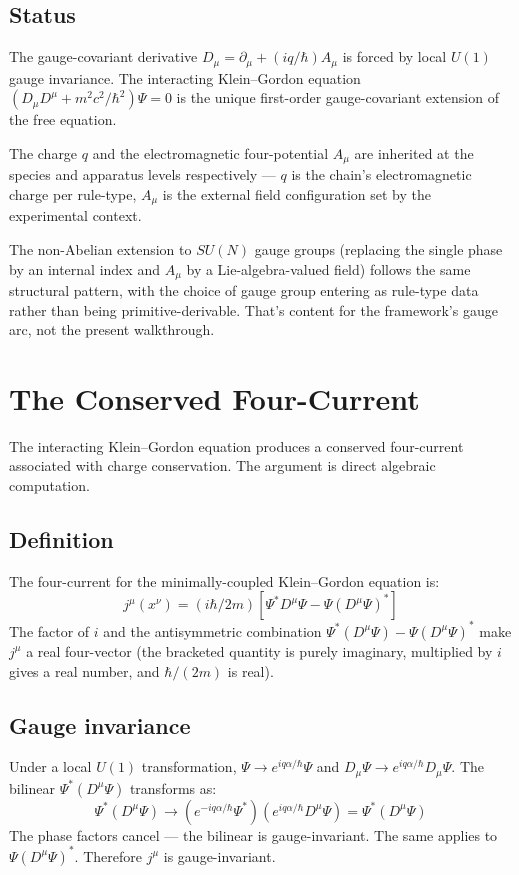 \documentclass[11pt,a4paper]{article}
\begin{document}
\subsection{Status}

The gauge-covariant derivative $D_\mu = \partial_\mu + (iq/\hbar)A_\mu$ is forced by local $U(1)$ gauge invariance. The interacting Klein--Gordon equation $(D_\mu D^\mu + m^2c^2/\hbar^2)\Psi = 0$ is the unique first-order gauge-covariant extension of the free equation.

The charge $q$ and the electromagnetic four-potential $A_\mu$ are inherited at the species and apparatus levels respectively --- $q$ is the chain's electromagnetic charge per rule-type, $A_\mu$ is the external field configuration set by the experimental context.

The non-Abelian extension to $SU(N)$ gauge groups (replacing the single phase by an internal index and $A_\mu$ by a Lie-algebra-valued field) follows the same structural pattern, with the choice of gauge group entering as rule-type data rather than being primitive-derivable. That's content for the framework's gauge arc, not the present walkthrough.

\section{The Conserved Four-Current}

The interacting Klein--Gordon equation produces a conserved four-current associated with charge conservation. The argument is direct algebraic computation.

\subsection{Definition}

The four-current for the minimally-coupled Klein--Gordon equation is:
\[
j^\mu(x^\nu) = (i\hbar/2m)[\Psi^* D^\mu\Psi - \Psi(D^\mu\Psi)^*]
\]
The factor of $i$ and the antisymmetric combination $\Psi^*(D^\mu\Psi) - \Psi(D^\mu\Psi)^*$ make $j^\mu$ a real four-vector (the bracketed quantity is purely imaginary, multiplied by $i$ gives a real number, and $\hbar/(2m)$ is real).

\subsection{Gauge invariance}

Under a local $U(1)$ transformation, $\Psi \to e^{iq\alpha/\hbar}\Psi$ and $D_\mu\Psi \to e^{iq\alpha/\hbar}D_\mu\Psi$. The bilinear $\Psi^*(D^\mu\Psi)$ transforms as:
\[
\Psi^*(D^\mu\Psi) \to (e^{-iq\alpha/\hbar}\Psi^*)(e^{iq\alpha/\hbar}D^\mu\Psi) = \Psi^*(D^\mu\Psi)
\]
The phase factors cancel --- the bilinear is gauge-invariant. The same applies to $\Psi(D^\mu\Psi)^*$. Therefore $j^\mu$ is gauge-invariant.
\end{document}

